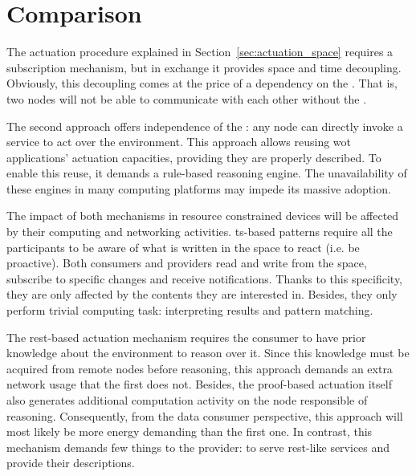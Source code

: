 \section{Comparison}
\label{sec:actuation_comparison}

The actuation procedure explained in Section~\ref{sec:actuation_space} requires a subscription mechanism, but in exchange it provides space and time decoupling.
Obviously, this decoupling comes at the price of a dependency on the \Space{}.
That is, two nodes will not be able to communicate with each other without the \Space{}.


The second approach offers independence of the \Space{}: any node can directly invoke a service to act over the environment.
This approach allows reusing \ac{wot} applications' actuation capacities, providing they are properly described. %
To enable this reuse, it demands a rule-based reasoning engine. %
The unavailability of these engines in many computing platforms may impede its massive adoption. %





\bigskip

The impact of both mechanisms in resource constrained devices will be affected by their computing and networking activities.
\ac{ts}-based patterns require all the participants to be aware of what is written in the space to react (i.e. be proactive).
Both consumers and providers read and write from the space, subscribe to specific changes and receive notifications.
Thanks to this specificity, they are only affected by the contents they are interested in. %
Besides, they only perform trivial computing task: interpreting results and pattern matching. %


The \ac{rest}-based actuation mechanism requires the consumer to have prior knowledge about the environment to reason over it. %
Since this knowledge must be acquired from remote nodes before reasoning, this approach demands an extra network usage that the first does not.
Besides, the proof-based actuation itself also generates additional computation activity on the node responsible of reasoning.
Consequently, from the data consumer perspective, this approach will most likely be more energy demanding than the first one. %
In contrast, this mechanism demands few things to the provider: to serve \ac{rest}-like services and provide their descriptions. %


